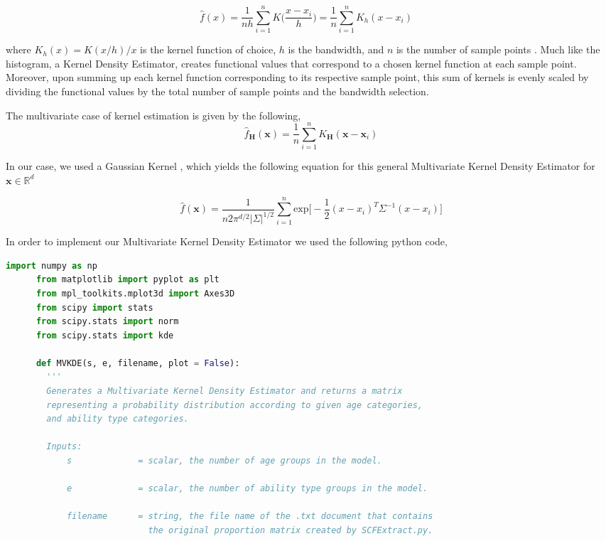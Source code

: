 \documentclass[letterpaper,12pt]{article}
\theoremstyle{definition}
\begin{document}
\begin{spacing}{1.5}
    \[\hat{f}(x) = \frac{1}{nh} \sum_{i=1}^n K\Big(\frac{x-x_i}{h}\Big)= \frac{1}{n}\sum_{i=1}^n K_h (x - x_i) \quad \]

    where $K_h(x) =  K(x/h)/x$ is the kernel function of choice, $h$ is the bandwidth, and $n$ is the number of sample points \citet{Scott:2015}. Much like the histogram, a Kernel Density Estimator, creates functional values that correspond to a chosen kernel function at each sample point. Moreover, upon summing up each kernel function corresponding to its respective sample point, this sum of kernels is evenly scaled by dividing the functional values by the total number of sample points and the bandwidth selection.

    The multivariate case of kernel estimation is given by the following,
    \[\hat{f}_\mathbf{H}(\mathbf{x})= \frac1n \sum_{i=1}^n K_\mathbf{H} (\mathbf{x} - \mathbf{x}_i)\]

    In our case, we used a Gaussian Kernel , which yields the following equation for this general Multivariate Kernel Density Estimator for $\mathbf{x} \in \mathbb{R}^d$

    \[\hat{f}(\mathbf{x}) = \frac{1}{n2\pi ^{d/2} |\Sigma|^{1/2}} \sum_{i=1}^n \text{exp}\big[-\frac{1}{2}(x-x_i)^T\Sigma ^{-1}(x-x_i)\big]\]
    \citet{Scott:2005}

    In order to implement our Multivariate Kernel Density Estimator we used the following python code,\\

    \begin{lstlisting}[language=Python, caption=MVKDE.py]
      import numpy as np
      from matplotlib import pyplot as plt
      from mpl_toolkits.mplot3d import Axes3D
      from scipy import stats
      from scipy.stats import norm
      from scipy.stats import kde

      def MVKDE(s, e, filename, plot = False):
        '''
        Generates a Multivariate Kernel Density Estimator and returns a matrix
        representing a probability distribution according to given age categories,
        and ability type categories.

        Inputs:
            s             = scalar, the number of age groups in the model.

            e             = scalar, the number of ability type groups in the model.

            filename      = string, the file name of the .txt document that contains
                            the original proportion matrix created by SCFExtract.py.


\end{lstlisting}
\end{spacing}
\end{document}
